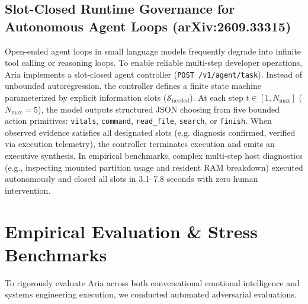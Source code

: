 \documentclass[10pt,a4paper]{article}
\begin{document}
\subsection{Slot-Closed Runtime Governance for Autonomous Agent Loops (arXiv:2609.33315)}
Open-ended agent loops in small language models frequently degrade into infinite tool calling or reasoning loops. To enable reliable multi-step developer operations, Aria implements a slot-closed agent controller (\texttt{POST /v1/agent/task}). Instead of unbounded autoregression, the controller defines a finite state machine parameterized by explicit information slots ($\mathcal{S}_{\text{needed}}$). At each step $t \in [1, N_{\max}]$ ($N_{\max} = 5$), the model outputs structured JSON choosing from five bounded action primitives: \texttt{vitals}, \texttt{command}, \texttt{read\_file}, \texttt{search}, or \texttt{finish}. When observed evidence satisfies all designated slots (e.g. diagnosis confirmed, verified via execution telemetry), the controller terminates execution and emits an executive synthesis. In empirical benchmarks, complex multi-step host diagnostics (e.g., inspecting mounted partition usage and resident RAM breakdown) executed autonomously and closed all slots in 3.1--7.8 seconds with zero human intervention.

\section{Empirical Evaluation \& Stress Benchmarks}

To rigorously evaluate Aria across both conversational emotional intelligence and systems engineering execution, we conducted automated adversarial evaluations.
\end{document}
